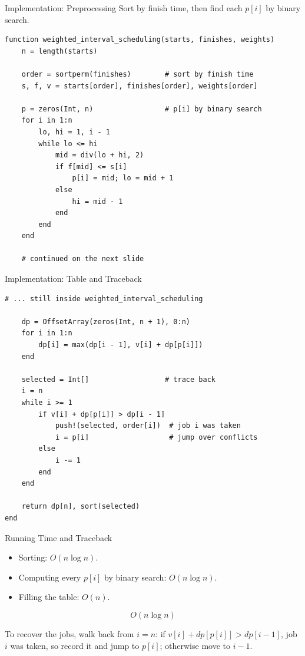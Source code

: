 \documentclass[10pt,aspectratio=169]{beamer}
\begin{document}
\begin{frame}[fragile]{Implementation: Preprocessing}
  Sort by finish time, then find each $p[i]$ by binary search.

  \begin{lstlisting}[basicstyle=\ttfamily\scriptsize]
function weighted_interval_scheduling(starts, finishes, weights)
    n = length(starts)

    order = sortperm(finishes)        # sort by finish time
    s, f, v = starts[order], finishes[order], weights[order]

    p = zeros(Int, n)                 # p[i] by binary search
    for i in 1:n
        lo, hi = 1, i - 1
        while lo <= hi
            mid = div(lo + hi, 2)
            if f[mid] <= s[i]
                p[i] = mid; lo = mid + 1
            else
                hi = mid - 1
            end
        end
    end

    # continued on the next slide
  \end{lstlisting}
\end{frame}

\begin{frame}[fragile]{Implementation: Table and Traceback}
  \begin{lstlisting}[basicstyle=\ttfamily\scriptsize]
    # ... still inside weighted_interval_scheduling

    dp = OffsetArray(zeros(Int, n + 1), 0:n)
    for i in 1:n
        dp[i] = max(dp[i - 1], v[i] + dp[p[i]])
    end

    selected = Int[]                  # trace back
    i = n
    while i >= 1
        if v[i] + dp[p[i]] > dp[i - 1]
            push!(selected, order[i])  # job i was taken
            i = p[i]                   # jump over conflicts
        else
            i -= 1
        end
    end

    return dp[n], sort(selected)
end
  \end{lstlisting}
\end{frame}

\begin{frame}{Running Time and Traceback}
  \begin{itemize}
    \item Sorting: $O(n \log n)$.
    \item Computing every $p[i]$ by binary search: $O(n \log n)$.
    \item Filling the table: $O(n)$.
  \end{itemize}

  \bigskip
  \begin{alertblock}{}
    \[
      O(n \log n)
    \]
  \end{alertblock}

  \bigskip
  To recover the jobs, walk back from $i = n$:
  if $v[i] + dp[p[i]] > dp[i-1]$, job $i$ was taken, so record it and jump to
  $p[i]$; otherwise move to $i-1$.
\end{frame}
\end{document}
